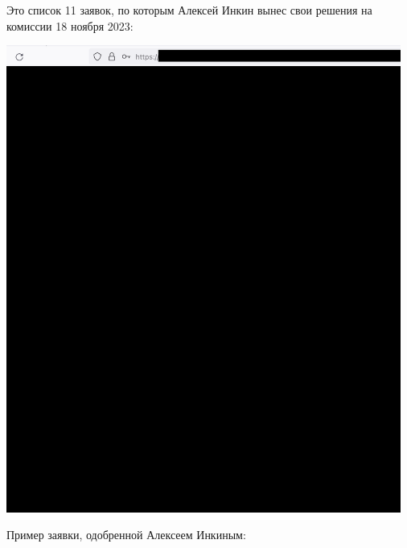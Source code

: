 
Это список 11 заявок, по которым Алексей Инкин вынес свои решения
на комиссии 18 ноября 2023:

\begin{center}
    \includegraphics[width=35em]{applications_public}
\end{center}
\pagebreak

Пример заявки, одобренной Алексеем Инкиным:

